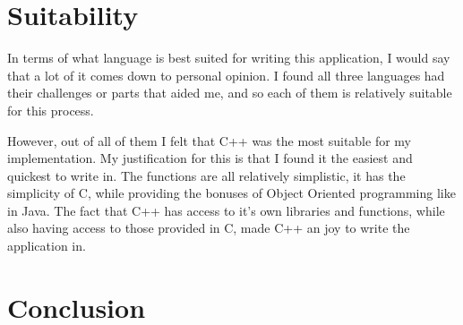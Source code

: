 \documentclass{article}
\begin{document}


\section{Suitability}

In terms of what language is best suited for writing this application, I would say that a lot of it comes down to personal opinion. I found all three languages had their challenges or parts that aided me, and so each of them is relatively suitable for this process. 

However, out of all of them I felt that C++  was the most suitable for my implementation. My justification for this is that I found it the easiest and quickest to write in. The functions are all relatively simplistic, it has the simplicity of C, while providing the bonuses of Object Oriented programming like in Java. The fact that C++ has access to it's own libraries and functions, while also having access to those provided in C, made C++ an joy to write the application in.




\clearpage

\section{Conclusion}


\clearpage


\begin{thebibliography}{1}



\end{thebibliography}
\end{document}
